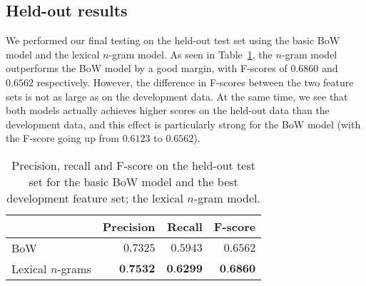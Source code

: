 \documentclass[11pt,letterpaper]{article}
\begin{document}
      


\subsection{Held-out results}
\label{sec:heldout}

We performed our final testing on the held-out test set using the basic BoW model and the lexical $n$-gram model. As seen in Table~\ref{tab:heldout}, the $n$-gram model outperforms the BoW model by a good margin, with F-scores of $0.6860$ and $0.6562$ respectively. However, the difference in F-scores between the two feature sets is not as large as on the development data. At the same time, we see that both models actually achieves higher scores on the held-out data than the development data, and this effect is particularly strong for the BoW model (with the F-score going up from $0.6123$ to $0.6562$). %



\begin{table}
\begin{smaller}
  \begin{center}
    \begin{tabular}{lrrr}
      \toprule      
      & Precision & Recall & F-score\\
      \midrule
      BoW & $0.7325$ & $0.5943$ & $0.6562$ \\
      Lexical $n$-grams & $\textbf{0.7532}$ & $\textbf{0.6299}$ & $\textbf{0.6860}$  \\
      \bottomrule
    \end{tabular}
  \end{center}
  \caption{Precision, recall and F-score on the held-out test set for the basic BoW model and the best development feature set; the lexical $n$-gram model.}
  \label{tab:heldout}
\end{smaller}
\end{table}
\end{document}

